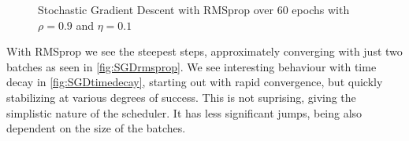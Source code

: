 \documentclass{article}
\theoremstyle{definition}
\begin{document}
\begin{figure}[H]%
    \centering
    \qquad
    \caption{Stochastic Gradient Descent with RMSprop over 60 epochs with $\rho = 0.9$ and $\eta = 0.1$}%
    \label{fig:SGDrmsprop}%
\end{figure}

With RMSprop we see the steepest steps, approximately converging with just two batches as seen in \autoref{fig:SGDrmsprop}. We see interesting behaviour with time decay in \autoref{fig:SGDtimedecay}, starting out with rapid convergence, but quickly stabilizing at various degrees of success. This is not suprising, giving the simplistic nature of the scheduler. It has less significant jumps, being also dependent on the size of the batches.
\end{document}
